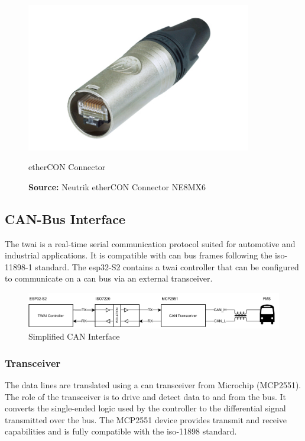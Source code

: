 \begin{figure}[h!]
	\centering
	\includegraphics[height=6.5cm]{images/ethercon.jpg}
	\caption{etherCON Connector}
	\vspace{-1.4ex}
	\caption*{\textbf{Source:} Neutrik etherCON Connector NE8MX6 \cite{neutrik-ethercon}}
	\label{fig:neutrik-ethercon}
\end{figure}


\subsection{CAN-Bus Interface}
The \acrfull{twai} is a real-time serial communication protocol suited for automotive and industrial applications. It is compatible with \acrshort{can} bus frames following the \acrshort{iso}-11898-1 standard. The \gls{esp32}-S2 contains a \acrshort{twai} controller that can be configured to communicate on a \acrshort{can} bus via an external transceiver.

\begin{figure}[h!]
	\centering
	\includegraphics[width=\textwidth]{images/can-interface}
	\vspace{0.0cm}
	\caption{Simplified CAN Interface}
	\label{fig:can-interface}
\end{figure}

\subsubsection{Transceiver}
The data lines are translated using a \acrshort{can} transceiver from Microchip (MCP2551). The role of the transceiver is to drive and detect data to and from the bus. It converts the single-ended logic used by the controller to the differential signal transmitted over the bus. The MCP2551 device provides transmit and receive capabilities and is fully compatible with the \acrshort{iso}-11898 standard.
\newpage

